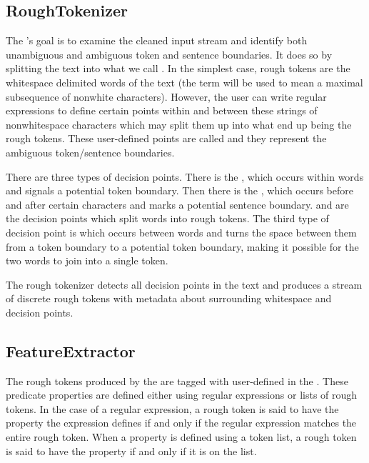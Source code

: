 \subsection{RoughTokenizer}
\label{ssec:impl-overview-roughtokenizer}

The 's goal is to examine the cleaned input stream and
identify both unambiguous and ambiguous token and sentence boundaries. It does
so by splitting the text into what we call . In the
simplest case, rough tokens are the whitespace delimited words of the text (the
term  will be used to mean a maximal subsequence of nonwhite
characters). However, the user can write regular expressions to define certain
points within and between these strings of nonwhitespace characters which may
split them up into what end up being the rough tokens. These user-defined
points are called  and they represent the ambiguous
token/sentence boundaries.

There are three types of decision points. There is the \maysplit{}, which occurs
within words and signals a potential token boundary. Then there is the
\maybreaksentence{}, which occurs before and after certain characters and marks
a potential sentence boundary. \maysplit{} and \maybreaksentence{} are the
decision points which split words into rough tokens. The third type of decision
point is \mayjoin{} which occurs between words and turns the space between them
from a token boundary to a potential token boundary, making it possible for the
two words to join into a single token.

The rough tokenizer detects all decision points in the text and produces a
stream of discrete rough tokens with metadata about surrounding whitespace and
decision points.

\subsection{FeatureExtractor}
\label{ssec:impl-overview-featureextractor}

The rough tokens produced by the  are tagged with
user-defined  in the . These
predicate properties are defined either using regular expressions or lists of
rough tokens. In the case of a regular expression, a rough token is said to
have the property the expression defines if and only if the regular expression
matches the entire rough token. When a property is defined using a token list,
a rough token is said to have the property if and only if it is on the list.

